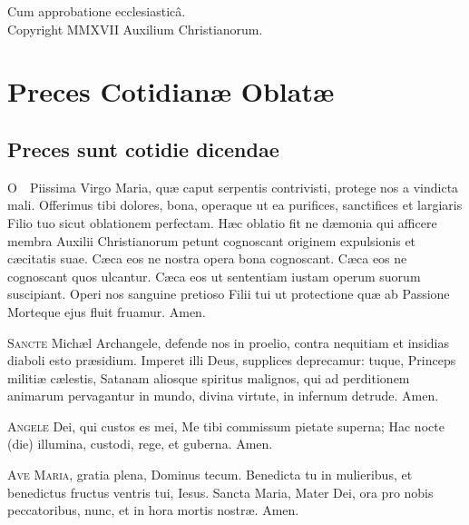 \documentclass[9pt, twoside]{book}
\begin{document}
\noindent Cum approbatione ecclesiasticâ.\\
Copyright MMXVII Auxilium Christianorum.

\chapter{Preces Cotidianæ Oblatæ}
\thispagestyle{empty}

\section{Preces sunt cotidie dicendae}

\begin{vresponses}
\end{vresponses}

\lettrine{O}\ \ Piissima Virgo Maria, quæ caput serpentis contrivisti, protege nos a vindicta mali. Offerimus tibi dolores, bona, operaque ut ea purifices, sanctifices et largiaris Filio tuo sicut oblationem perfectam. Hæc oblatio fit ne dæmonia qui afficere membra Auxilii Christianorum petunt cognoscant originem expulsionis et cæcitatis suae. Cæca eos ne nostra opera bona cognoscant. Cæca eos ne cognoscant quos ulcantur. Cæca eos ut sententiam iustam operum suorum suscipiant. Operi nos sanguine pretioso Filii tui ut protectione quæ ab Passione Morteque ejus fluit fruamur. Amen.

\textsc{Sancte} Michæl Archangele, defende nos in proelio, contra nequitiam et insidias diaboli esto præsidium. Imperet illi Deus, supplices deprecamur: tuque, Princeps militiæ cælestis, Satanam aliosque spiritus malignos, qui ad perditionem animarum pervagantur in mundo, divina virtute, in infernum detrude. Amen.

\textsc{Angele} Dei, qui custos es mei, Me tibi commissum pietate superna; Hac nocte (die) illumina, custodi, rege, et guberna. Amen.


\textsc{Ave Maria}, gratia plena, Dominus tecum. Benedicta tu in mulieribus, et benedictus fructus ventris tui, Iesus. Sancta Maria, Mater Dei, ora pro nobis peccatoribus, nunc, et in hora mortis nostræ. Amen.
\end{document}
